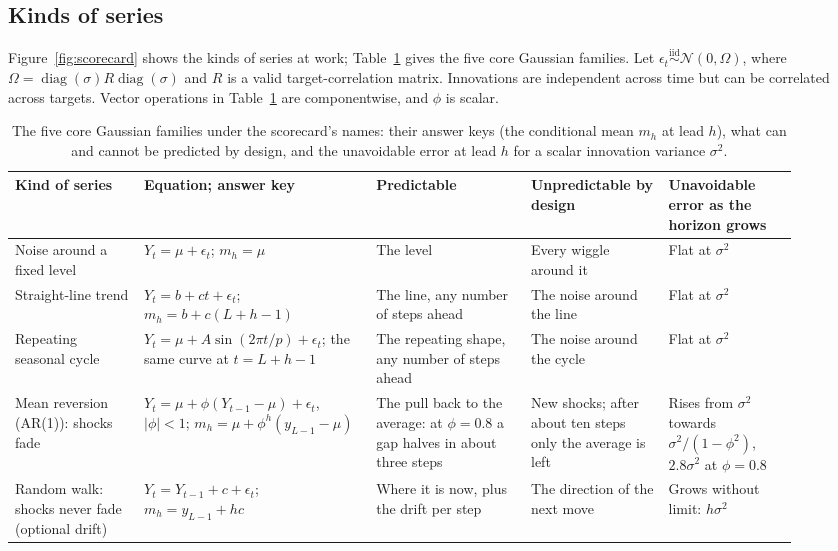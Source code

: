 \documentclass[11pt,a4paper]{article}
\begin{document}
\subsection{Kinds of series}

Figure~\ref{fig:scorecard} shows the kinds of series at work;
Table~\ref{tab:families} gives the five core Gaussian families.
Let $\epsilon_t\stackrel{\mathrm{iid}}{\sim}\mathcal{N}(0,\Omega)$, where
$\Omega=\operatorname{diag}(\sigma)R\operatorname{diag}(\sigma)$ and $R$
is a valid target-correlation matrix. Innovations are independent across
time but can be correlated across targets. Vector operations in
Table~\ref{tab:families} are componentwise, and $\phi$ is scalar.

\begin{table}[!htb]
\centering\footnotesize
\setlength{\tabcolsep}{4pt}
\begin{tabular}{@{}>{\raggedright\arraybackslash}p{0.15\linewidth}>{\raggedright\arraybackslash}p{0.27\linewidth}>{\raggedright\arraybackslash}p{0.18\linewidth}>{\raggedright\arraybackslash}p{0.16\linewidth}>{\raggedright\arraybackslash}p{0.15\linewidth}@{}}
\toprule
Kind of series & Equation; answer key & Predictable & Unpredictable by design & Unavoidable error as the horizon grows \\
\midrule
Noise around a fixed level & $Y_t=\mu+\epsilon_t$; $m_h=\mu$ & The level & Every wiggle around it & Flat at $\sigma^2$ \\[0.5em]
Straight-line trend & $Y_t=b+ct+\epsilon_t$; $m_h=b+c(L+h-1)$ & The line, any number of steps ahead & The noise around the line & Flat at $\sigma^2$ \\[0.5em]
Repeating seasonal cycle & $Y_t=\mu+A\sin(2\pi t/p)+\epsilon_t$; the same curve at $t=L+h-1$ & The repeating shape, any number of steps ahead & The noise around the cycle & Flat at $\sigma^2$ \\[0.5em]
Mean reversion (AR(1)): shocks fade & $Y_t=\mu+\phi(Y_{t-1}-\mu)+\epsilon_t$, $|\phi|<1$; $m_h=\mu+\phi^h(y_{L-1}-\mu)$ & The pull back to the average: at $\phi=0.8$ a gap halves in about three steps & New shocks; after about ten steps only the average is left & Rises from $\sigma^2$ towards $\sigma^2/(1-\phi^2)$, $2.8\sigma^2$ at $\phi=0.8$ \\[0.5em]
Random walk: shocks never fade (optional drift) & $Y_t=Y_{t-1}+c+\epsilon_t$; $m_h=y_{L-1}+hc$ & Where it is now, plus the drift per step & The direction of the next move & Grows without limit: $h\sigma^2$ \\
\bottomrule
\end{tabular}
\caption{The five core Gaussian families under the scorecard's names:
their answer keys (the conditional mean $m_h$ at lead $h$), what can and
cannot be predicted by design, and the unavoidable error at lead $h$ for
a scalar innovation variance $\sigma^2$.}
\label{tab:families}
\end{table}
\end{document}
